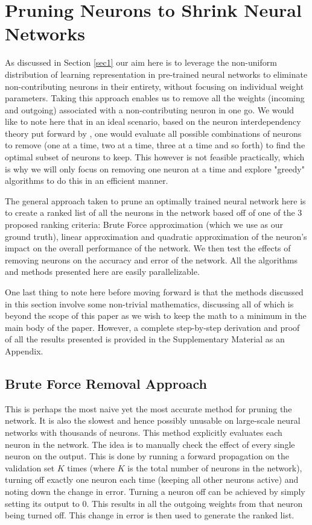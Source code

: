 \section{Pruning Neurons to Shrink Neural Networks}\label{sec2}
As discussed in Section \ref{sec1} our aim here is to leverage the non-uniform distribution of learning representation in pre-trained neural networks to eliminate non-contributing neurons in their entirety, without focusing on individual weight parameters. Taking this approach enables us to remove all the weights (incoming and outgoing) associated with a non-contributing neuron in one go. We would like to note here that in an ideal scenario, based on the neuron interdependency theory put forward by \cite{mozer1989skeletonization}, one would evaluate all possible combinations of neurons to remove (one at a time, two at a time, three at a time and so forth) to find the optimal subset of neurons to keep. This however is not feasible practically, which is why we will only focus on removing one neuron at a time and explore "greedy" algorithms to do this in an efficient manner.

The general approach taken to prune an optimally trained neural network here is to create a ranked list of all the neurons in the network based off of one of the 3 proposed ranking criteria: Brute Force approximation (which we use as our ground truth), linear approximation and quadratic approximation of the neuron's impact on the overall performance of the network. We then test the effects of removing neurons on the accuracy and error of the network. All the algorithms and methods presented here are easily parallelizable. 

One last thing to note here before moving forward is that the methods discussed in this section involve some non-trivial mathematics, discussing all of which is beyond the scope of this paper as we wish to keep the math to a minimum in the main body of the paper. However, a complete step-by-step derivation and proof of all the results presented is provided in the Supplementary Material as an Appendix.

\subsection{Brute Force Removal Approach}
This is perhaps the most naive yet the most accurate method for pruning the network. It is also the slowest and hence possibly unusable on large-scale neural networks with thousands of neurons. This method explicitly evaluates each neuron in the network. The idea is to manually check the effect of every single neuron on the output. This is done by running a forward propagation on the validation set $K$ times (where $K$ is the total number of neurons in the network), turning off exactly one neuron each time (keeping all other neurons active) and noting down the change in error. Turning a neuron off can be achieved by simply setting its output to 0. This results in all the outgoing weights from that neuron being turned off. This change in error is then used to generate the ranked list. 




